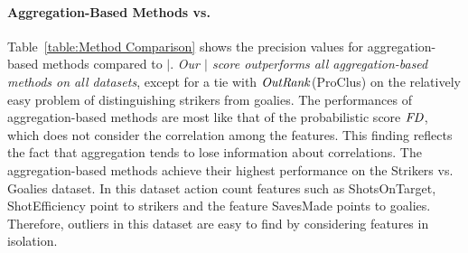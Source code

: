 \documentclass[conference]{IEEEtran}
\begin{document}
%							
			\begin{table}
				\centering
				\caption{\textit{AUC} of $\mid$ vs. $|LR|$. 
					\label{table:Metric Comparison}}
					
				\end{table}
								\paragraph{Aggregation-Based Methods vs. \mid} 
								Table~\ref{table:Method Comparison} shows the precision values for aggregation-based methods compared to $\mid$. {\em Our $\mid$ score outperforms all aggregation-based methods on all datasets}, except for a tie with $\it{OutRank}$(ProClus) on the relatively easy problem of distinguishing strikers from goalies.
								The performances of aggregation-based methods are most like that of the probabilistic score $\it{FD}$, which does not consider the
								correlation among the features. This finding reflects the fact that aggregation tends to lose information about correlations.
								The aggregation-based methods achieve their highest performance on the Strikers vs. Goalies dataset. In this dataset action count features such as ShotsOnTarget, ShotEfficiency point to strikers and the feature SavesMade points to goalies. Therefore, outliers in this dataset are easy to find by considering features in isolation.
								
\end{document}
